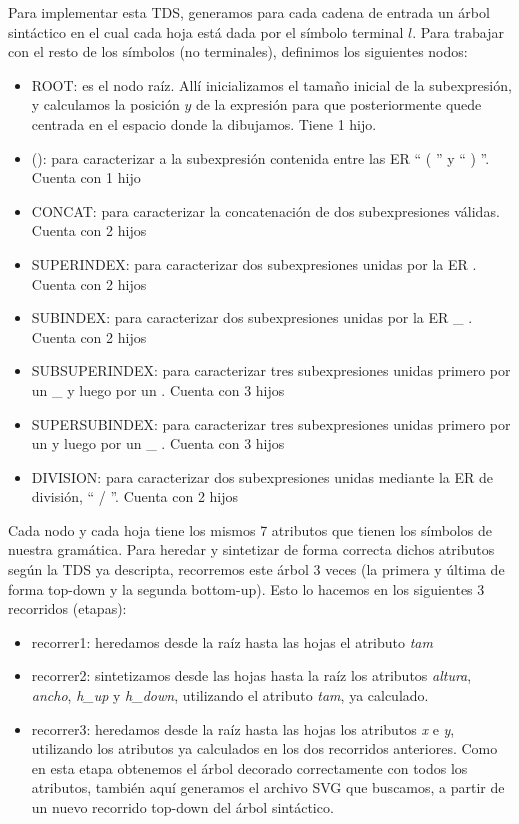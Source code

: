\documentclass[a4paper, 10pt, twoside]{article}
\begin{document}
Para implementar esta TDS, generamos para cada cadena de entrada un árbol sintáctico en el cual cada hoja está dada por el símbolo terminal $l$. Para trabajar con el resto de los símbolos (no terminales), definimos los siguientes nodos:
\begin{itemize}
  \item ROOT: es el nodo raíz. Allí inicializamos el tamaño inicial de la subexpresión, y calculamos la posición $y$ de la expresión para que posteriormente quede centrada en el espacio donde la dibujamos. Tiene 1 hijo.
  \item (): para caracterizar a la subexpresión contenida entre las ER `` ( '' y `` ) ''. Cuenta con 1 hijo
  \item CONCAT: para caracterizar la concatenación de dos subexpresiones válidas. Cuenta con 2 hijos
  \item SUPERINDEX: para caracterizar dos subexpresiones unidas por la ER \detokenize{^}. Cuenta con 2 hijos
  \item SUBINDEX: para caracterizar dos subexpresiones unidas por la ER \_ . Cuenta con 2 hijos
  \item SUBSUPERINDEX: para caracterizar tres subexpresiones unidas primero por un \_ y luego por un \detokenize{^}. Cuenta con 3 hijos
  \item SUPERSUBINDEX: para caracterizar tres subexpresiones unidas primero por un \detokenize{^} y luego por un \_ . Cuenta con 3 hijos
  \item DIVISION: para caracterizar dos subexpresiones unidas mediante la ER de división, `` / ''. Cuenta con 2 hijos
\end{itemize}

Cada nodo y cada hoja tiene los mismos 7 atributos que tienen los símbolos de nuestra gramática. Para heredar y sintetizar de forma correcta dichos atributos según la TDS ya descripta, recorremos este árbol 3 veces (la primera y última de forma top-down y la segunda bottom-up). Esto lo hacemos en los siguientes 3 recorridos (etapas):
\begin{itemize}
  \item recorrer1: heredamos desde la raíz hasta las hojas el atributo \emph{tam}
  \item recorrer2: sintetizamos desde las hojas hasta la raíz los atributos \emph{altura}, \emph{ancho}, \emph{h\_up} y \emph{h\_down}, utilizando el atributo \emph{tam}, ya calculado.
  \item recorrer3: heredamos desde la raíz hasta las hojas los atributos \emph{x} e \emph{y}, utilizando los atributos ya calculados en los dos recorridos anteriores. Como en esta etapa obtenemos el árbol decorado correctamente con todos los atributos, también aquí generamos el archivo SVG que buscamos, a partir de un nuevo recorrido top-down del árbol sintáctico.
\end{itemize}
\end{document}
